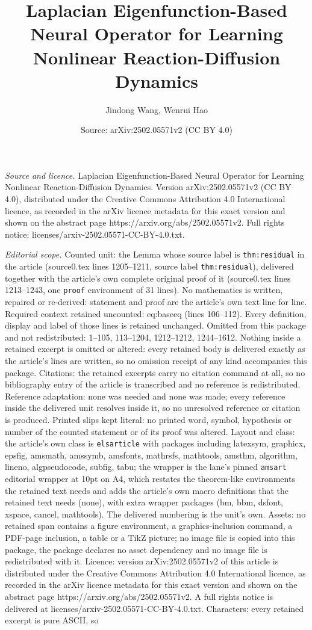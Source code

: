 \documentclass[10pt,a4paper]{amsart}
\title[Laplacian Eigenfunction-Based Neural Operator for Learning N]{Laplacian Eigenfunction-Based Neural Operator for Learning Nonlinear Reaction-Diffusion Dynamics}
\author{Jindong Wang, Wenrui Hao}
\date{Source: arXiv:2502.05571v2 (CC BY 4.0)}
\begin{document}
\maketitle

\noindent\emph{Source and licence.} Laplacian Eigenfunction-Based Neural Operator for Learning Nonlinear Reaction-Diffusion Dynamics. Version arXiv:2502.05571v2 (CC BY 4.0), distributed under the Creative Commons Attribution 4.0 International licence, as recorded in the arXiv licence metadata for this exact version and shown on the abstract page https://arxiv.org/abs/2502.05571v2. Full rights notice: licenses/arxiv-2502.05571-CC-BY-4.0.txt.\par\smallskip

\noindent\textit{Editorial scope.} Counted unit: the Lemma whose source label is \texttt{thm:residual} in the article (source0.tex lines 1205--1211, source label \texttt{thm:residual}), delivered together with the article's own complete original proof of it (source0.tex lines 1213--1243, one \texttt{proof} environment of 31 lines). No mathematics is written, repaired or re-derived: statement and proof are the article's own text line for line. Required context retained uncounted: eq:baseeq (lines 106--112). Every definition, display and label of those lines is retained unchanged. Omitted from this package and not redistributed: 1--105, 113--1204, 1212--1212, 1244--1612. Nothing inside a retained excerpt is omitted or altered: every retained body is delivered exactly as the article's lines are written, so no omission receipt of any kind accompanies this package. Citations: the retained excerpts carry no citation command at all, so no bibliography entry of the article is transcribed and no reference is redistributed. Reference adaptation: none was needed and none was made; every reference inside the delivered unit resolves inside it, so no unresolved reference or citation is produced. Printed slips kept literal: no printed word, symbol, hypothesis or number of the counted statement or of its proof was altered. Layout and class: the article's own class is \texttt{elsarticle} with packages including latexsym, graphicx, epsfig, amsmath, amssymb, amsfonts, mathrsfs, mathtools, amsthm, algorithm, lineno, algpseudocode, subfig, tabu; the wrapper is the lane's pinned \texttt{amsart} editorial wrapper at 10pt on A4, which restates the theorem-like environments the retained text needs and adds the article's own macro definitions that the retained text needs (none), with extra wrapper packages (bm, bbm, dsfont, xspace, cancel, mathtools). The delivered numbering is the unit's own. Assets: no retained span contains a figure environment, a graphics-inclusion command, a PDF-page inclusion, a table or a TikZ picture; no image file is copied into this package, the package declares no asset dependency and no image file is redistributed with it. Licence: version arXiv:2502.05571v2 of this article is distributed under the Creative Commons Attribution 4.0 International licence, as recorded in the arXiv licence metadata for this exact version and shown on the abstract page https://arxiv.org/abs/2502.05571v2. A full rights notice is delivered at licenses/arxiv-2502.05571-CC-BY-4.0.txt. Characters: every retained excerpt is pure ASCII, so 
\end{document}
